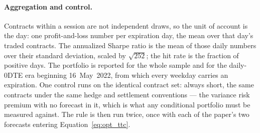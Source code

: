 \paragraph{Aggregation and control.} Contracts within a session are not
independent draws, so the unit of account is the day: one
profit-and-loss number per expiration day, the mean over that day's
traded contracts. The annualized Sharpe ratio is the mean of those daily
numbers over their standard deviation, scaled by $\sqrt{252}$; the hit
rate is the fraction of positive days. The portfolio is reported for the whole
sample and for the daily-0DTE era beginning 16~May~2022, from which every
weekday carries an expiration. One control runs on the identical contract
set: always short, the same contracts under the same hedge and settlement
conventions --- the variance risk premium with no forecast in it, which
is what any conditional portfolio must be measured against. The rule is then
run twice, once with each of the paper's two forecasts entering
Equation~\eqref{eq:opt_ttc}.
